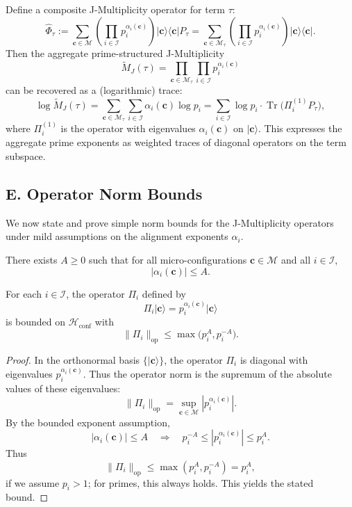 \documentclass[11pt]{article}
\begin{document}
Define a composite J-Multiplicity operator for term \(\tau\):
\[
\widehat{\Phi}_\tau := \sum_{\mathbf{c}\in\mathcal{M}} \left( \prod_{i\in\mathcal{I}} p_i^{\alpha_i(\mathbf{c})} \right) \lvert \mathbf{c} \rangle \langle \mathbf{c} \rvert P_\tau
= \sum_{\mathbf{c}\in\mathcal{M}_\tau} \left( \prod_{i\in\mathcal{I}} p_i^{\alpha_i(\mathbf{c})} \right) \lvert \mathbf{c} \rangle \langle \mathbf{c} \rvert.
\]
Then the aggregate prime-structured J-Multiplicity
\[
\widetilde{M}_J(\tau) = \prod_{\mathbf{c}\in\mathcal{M}_\tau} \prod_{i\in\mathcal{I}} p_i^{\alpha_i(\mathbf{c})}
\]
can be recovered as a (logarithmic) trace:
\[
\log \widetilde{M}_J(\tau)
= \sum_{\mathbf{c}\in\mathcal{M}_\tau} \sum_{i\in\mathcal{I}} \alpha_i(\mathbf{c}) \log p_i
= \sum_{i\in\mathcal{I}} \log p_i \cdot \operatorname{Tr}\big( \Pi_i^{(1)} P_\tau \big),
\]
where \(\Pi_i^{(1)}\) is the operator with eigenvalues \(\alpha_i(\mathbf{c})\) on \(\lvert \mathbf{c} \rangle\). This expresses the aggregate prime exponents as weighted traces of diagonal operators on the term subspace.

\subsection*{E. Operator Norm Bounds}

We now state and prove simple norm bounds for the J-Multiplicity operators under mild assumptions on the alignment exponents \(\alpha_i\).

\begin{assumption}
There exists \(A \ge 0\) such that for all micro-configurations \(\mathbf{c}\in\mathcal{M}\) and all \(i\in\mathcal{I}\),
\[
|\alpha_i(\mathbf{c})| \le A.
\]
\end{assumption}

\begin{lemma}
For each \(i\in\mathcal{I}\), the operator \(\Pi_i\) defined by
\[
\Pi_i \lvert \mathbf{c} \rangle = p_i^{\alpha_i(\mathbf{c})} \lvert \mathbf{c} \rangle
\]
is bounded on \(\mathcal{H}_{\text{conf}}\) with
\[
\|\Pi_i\|_{\text{op}} \le \max\big( p_i^{A}, p_i^{-A} \big).
\]
\end{lemma}

\begin{proof}
In the orthonormal basis \(\{ \lvert \mathbf{c} \rangle \}\), the operator \(\Pi_i\) is diagonal with eigenvalues \(p_i^{\alpha_i(\mathbf{c})}\). Thus the operator norm is the supremum of the absolute values of these eigenvalues:
\[
\|\Pi_i\|_{\text{op}} = \sup_{\mathbf{c}\in\mathcal{M}} |p_i^{\alpha_i(\mathbf{c})}|.
\]
By the bounded exponent assumption,
\[
|\alpha_i(\mathbf{c})| \le A \quad \Rightarrow \quad
p_i^{-A} \le |p_i^{\alpha_i(\mathbf{c})}| \le p_i^{A}.
\]
Thus
\[
\|\Pi_i\|_{\text{op}} \le \max(p_i^{A}, p_i^{-A}) = p_i^{A},
\]
if we assume \(p_i > 1\); for primes, this always holds. This yields the stated bound.
\end{proof}
\end{document}
